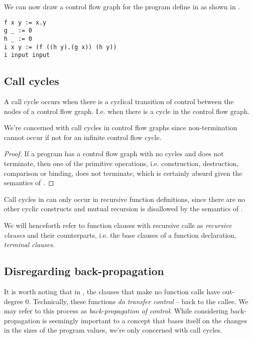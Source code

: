 We can now draw a control flow graph for the program define in
 as shown in .

\begin{lstlisting}[label=listing:cfg-sample-1,caption={A sample \D{} program, always returning \mono{0.0.0}.}]
f x y := x.y
g _ := 0
h _ := 0
i x y := (f ((h y).(g x)) (h y))
i input input
\end{lstlisting}



\subsection{Call cycles}

A call cycle occurs when there is a cyclical transition of control between the
nodes of a control flow graph. I.e. when there is a cycle in the control flow
graph.

\begin{lemma} We're concerned with call cycles in control flow graphs since
non-termination cannot occur if not for an infinite control flow cycle.
\end{lemma}

\begin{proof} If a program has a control flow graph with no cycles and does not
terminate, then one of the primitive operations, i.e. construction,
destruction, comparison or binding, does not terminate, which is certainly
absurd given the semantics of \D{}. \end{proof}

Call cycles in \D{} can only occur in recursive function definitions, since
there are no other cyclic constructs and mutual recursion is disallowed by the
semantics of \D{}.

We will henceforth refer to function clauses with recursive calls as
\emph{recursive clauses} and their counterparts, i.e. the base clauses of a
function declaration, \emph{terminal clauses}.

\subsection{Disregarding back-propagation}

It is worth noting that in , the clauses that make
no function calls have out-degree $0$. Technically, these functions \emph{do
transfer control} -- back to the callee. We may refer to this process as
\emph{back-propagation of control}. While considering back-propagation is
seemingly important to a concept that bases itself on the changes in the sizes
of the program values, we're only concerned with call cycles.

